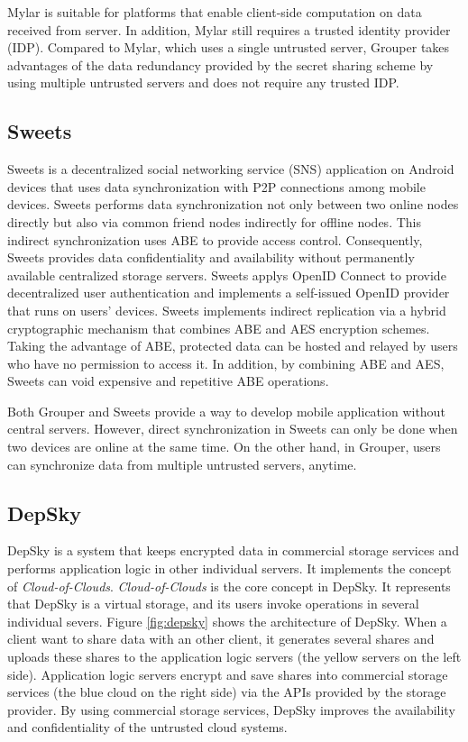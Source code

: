 \documentclass[a4paper,11pt]{report}
\begin{document}
Mylar is suitable for platforms that enable client-side computation on data received from server.
In addition, Mylar still requires a trusted identity provider (IDP).
Compared to Mylar, which uses a single untrusted server, Grouper takes advantages of the data redundancy provided by the secret sharing scheme by using multiple untrusted servers and does not require any trusted IDP.

\subsection{Sweets}
Sweets\cite{sweets} is a decentralized social networking service (SNS) application on Android devices that uses data synchronization with P2P connections among mobile devices. 
Sweets performs data synchronization not only between two online nodes directly but also via common friend nodes indirectly for offline nodes.
This indirect synchronization uses ABE to provide access control.
Consequently, Sweets provides data confidentiality and availability without permanently available centralized storage servers.
Sweets applys OpenID Connect to provide decentralized user authentication and implements a self-issued OpenID provider that runs on users’ devices.
Sweets implements indirect replication via a hybrid cryptographic mechanism that combines ABE and AES encryption schemes. 
Taking the advantage of ABE, protected data can be hosted and relayed by users who have no permission to access it. 
In addition, by combining ABE and AES, Sweets can void expensive and repetitive ABE operations.

Both Grouper and Sweets provide a way to develop mobile application without central servers.
However, direct synchronization in Sweets can only be done when two devices are online at the same time. 
On the other hand, in Grouper, users can synchronize data from multiple untrusted servers, anytime.

\subsection{DepSky}

DepSky\cite{bessani2013depsky} is a system that keeps encrypted data in commercial storage services and performs application logic in other individual servers.
It implements the concept of \emph{Cloud-of-Clouds}.  
\emph{Cloud-of-Clouds} is the core concept in DepSky.
It represents that DepSky is a virtual storage, and its users invoke operations in several individual severs. 
Figure \ref{fig:depsky} shows the architecture of DepSky.
When a client want to share data with an other client, it generates several shares and uploads these shares to the application logic servers (the yellow servers on the left side).
Application logic servers encrypt and save shares into commercial storage services (the blue cloud on the right side) via the APIs provided by the storage provider.
By using commercial storage services, DepSky improves the availability and confidentiality of the untrusted cloud systems.
\end{document}
